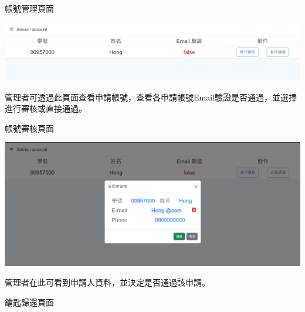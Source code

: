 \documentclass{article}
\begin{document}
	\bigskip
	\bigskip
	\bigskip
	\bigskip
	\bigskip

	\begin{Large}
		帳號管理頁面
	\end{Large}
	\bigskip
	\begin{center}
		\includegraphics[scale=0.35]{SDDAdminAccountManage.png}
	\end{center}
	\bigskip
	\bigskip
	管理者可透過此頁面查看申請帳號，查看各申請帳號Email驗證是否通過，並選擇進行審核或直接通過。

	\newpage

	\begin{Large}
		帳號審核頁面
	\end{Large}
	\bigskip
	\begin{center}
		\includegraphics[scale=0.35]{SDDAdminAccountVerify.png}
	\end{center}
	\bigskip
	\bigskip
	管理者在此可看到申請人資料，並決定是否通過該申請。

	\bigskip
	\bigskip
	\bigskip
	\bigskip
	\bigskip
	\bigskip

	\begin{Large}
		鑰匙歸還頁面
	\end{Large}
	\bigskip
	\begin{center}
	\end{center}
	\bigskip
	\bigskip
	\newpage
\end{document}
